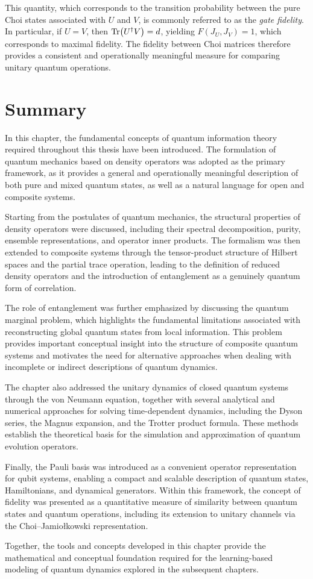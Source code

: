 This quantity, which corresponds to the transition probability between the pure Choi states associated with $U$ and $V$, is commonly referred to as the \emph{gate fidelity}. In particular, if $U = V$, then $\Tr(U^\dagger V) = d$, yielding $F(J_U, J_V) = 1$, which corresponds to maximal fidelity. The fidelity between Choi matrices therefore provides a consistent and operationally meaningful measure for comparing unitary quantum operations.

\section{Summary}
In this chapter, the fundamental concepts of quantum information theory required throughout this thesis have been introduced. The formulation of quantum mechanics based on density operators was adopted as the primary framework, as it provides a general and operationally meaningful description of both pure and mixed quantum states, as well as a natural language for open and composite systems.

Starting from the postulates of quantum mechanics, the structural properties of density operators were discussed, including their spectral decomposition, purity, ensemble representations, and operator inner products. The formalism was then extended to composite systems through the tensor-product structure of Hilbert spaces and the partial trace operation, leading to the definition of reduced density operators and the introduction of entanglement as a genuinely quantum form of correlation.

The role of entanglement was further emphasized by discussing the quantum marginal problem, which highlights the fundamental limitations associated with reconstructing global quantum states from local information. This problem provides important conceptual insight into the structure of composite quantum systems and motivates the need for alternative approaches when dealing with incomplete or indirect descriptions of quantum dynamics.

The chapter also addressed the unitary dynamics of closed quantum systems through the von Neumann equation, together with several analytical and numerical approaches for solving time-dependent dynamics, including the Dyson series, the Magnus expansion, and the Trotter product formula. These methods establish the theoretical basis for the simulation and approximation of quantum evolution operators.

Finally, the Pauli basis was introduced as a convenient operator representation for qubit systems, enabling a compact and scalable description of quantum states, Hamiltonians, and dynamical generators. Within this framework, the concept of fidelity was presented as a quantitative measure of similarity between quantum states and quantum operations, including its extension to unitary channels via the Choi--Jamiołkowski representation.

Together, the tools and concepts developed in this chapter provide the mathematical and conceptual foundation required for the learning-based modeling of quantum dynamics explored in the subsequent chapters.
